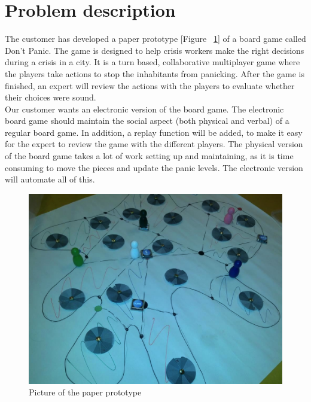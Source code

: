 \section{Problem description} 

The customer has developed a paper prototype [Figure ~\ref{fig:paperPrototype}] 
of a board game called Don’t Panic. The game is designed to help crisis workers 
make the right decisions during a crisis in a city. It is a turn based, 
collaborative multiplayer game where the players take actions to stop the 
inhabitants from panicking. After the game is finished, an expert will review 
the actions with the players to evaluate whether their choices were sound. 
\\
Our customer wants an electronic version of the board game. The electronic 
board game should maintain the social aspect (both physical and verbal) of a 
regular board game. In addition, a replay function will be added, to make it 
easy for the expert to review the game with the different players. The 
physical version of the board game takes a lot of work setting up and 
maintaining, as it is time consuming to move the pieces and update the panic 
levels. The electronic version will automate all of this.
\\

\begin{figure}[H]
  \centering
    \includegraphics[width=1.0\textwidth]{img/paper_prototype}
  \caption{Picture of the paper prototype} 
  \label{fig:paperPrototype}
\end{figure}


